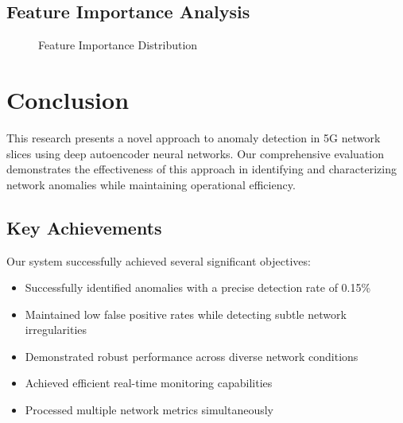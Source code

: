 \documentclass[12pt, a4paper]{article}
\begin{document}
\subsection{Feature Importance Analysis}
\begin{figure}[H]
\centering
{}
\caption{Feature Importance Distribution}
\label{fig:importance}
\end{figure}

\section{Conclusion}
This research presents a novel approach to anomaly detection in 5G network slices using deep autoencoder neural networks. Our comprehensive evaluation demonstrates the effectiveness of this approach in identifying and characterizing network anomalies while maintaining operational efficiency.

\subsection{Key Achievements}
Our system successfully achieved several significant objectives:
\begin{itemize}
    \item Successfully identified anomalies with a precise detection rate of 0.15\%
    \item Maintained low false positive rates while detecting subtle network irregularities
    \item Demonstrated robust performance across diverse network conditions
    \item Achieved efficient real-time monitoring capabilities
    \item Processed multiple network metrics simultaneously
\end{itemize}
\end{document}
